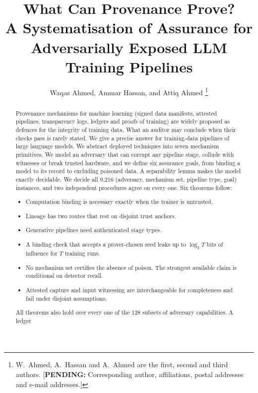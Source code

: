 \documentclass[journal,10pt]{IEEEtran}
\theoremstyle{definition}
\newcommand{\pending}[1]{{\color{red!70!black}[\textbf{PENDING:} #1]}}
\begin{document}
\title{What Can Provenance Prove?\\ A Systematisation of Assurance for\\ Adversarially Exposed LLM Training Pipelines}
\author{Waqas Ahmed, Ammar Hassan, and Attiq Ahmed%
\thanks{W.~Ahmed, A.~Hassan and A.~Ahmed are the first, second and third authors. \pending{Corresponding author, affiliations, postal addresses and e-mail addresses.}}}
\maketitle

\begin{abstract}
Provenance mechanisms for machine learning (signed data manifests, attested pipelines,
transparency logs, ledgers and proofs of training) are widely proposed as defences for the
integrity of training data. What an auditor may conclude when their checks pass is rarely
stated. We give a precise answer for training-data pipelines of large language models.
We abstract deployed techniques into seven mechanism primitives. We model an adversary
that can corrupt any pipeline stage, collude with witnesses or break trusted hardware, and
we define six assurance goals, from binding a model to its record to excluding poisoned
data. A separability lemma makes the model exactly decidable. We decide all 9,216
(adversary, mechanism set, pipeline type, goal) instances, and two independent procedures
agree on every one. Six theorems follow:
\begin{itemize}
\item Computation binding is necessary exactly when the trainer is untrusted.
\item Lineage has two routes that rest on disjoint trust anchors.
\item Generative pipelines need authenticated stage types.
\item A binding check that accepts a prover-chosen seed leaks up to $\log_2T$ bits of
  influence for $T$ training runs.
\item No mechanism set certifies the absence of poison. The strongest available claim is
  conditional on detector recall.
\item Attested capture and input witnessing are interchangeable for completeness and fail
  under disjoint assumptions.
\end{itemize}
All theorems also hold over every one of the 128 subsets of adversary capabilities. A ledger

\end{abstract}
\end{document}
